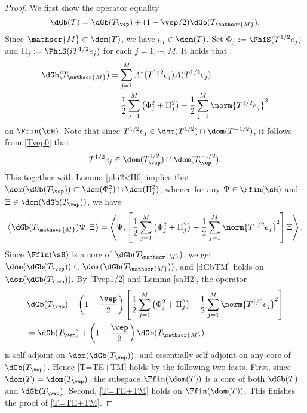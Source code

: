 \documentclass[12pt,draft]{article}
\theoremstyle{plain}
\numberwithin{equation}{section}
\theoremstyle{remark}
\begin{document}
\begin{proof}
We first show the operator equality
\begin{equation}\label{T=TE+TM}
\dGb(T)=\dGb(T_\vep)+(1-\vep/2)\dGb(T_\mathscr{M}).
\end{equation} 
Since $\mathscr{M}\subset\dom(T)$, we have $e_j\in\dom(T)$.
Set $\Phi_j := \PhiS(T^{1/2}e_j)$ and $\Pi_j := \PhiS(iT^{1/2}e_j)$ for each $j=1,\cdots,M$.
It holds that
\begin{align}\label{dGbTM}
 \dGb(T_\mathscr{M}) 
& = \sum_{j=1}^M A^*(T^{1/2}e_j) A(T^{1/2}e_j) \notag\\
& = \frac{1}{2}\sum_{j=1}^M  \left( \Phi_j^2 + \Pi_j^2 \right)
    - \frac{1}{2} \sum_{j=1}^M \norm{T^{1/2}e_j}^2 
\end{align}
on $\Ffin(\sH)$.
Note that since $T^{1/2}e_j\in\dom(T^{1/2})\cap\dom(T^{-1/2})$, 
it follows from \eqref{Tvep0} that 
\begin{equation}\label{Tvep1/2}
T^{1/2}e_j\in\dom(T_\vep^{1/2})\cap\dom(T_\vep^{-1/2}).
\end{equation}
This together with Lemma \ref{phi2<H0} implies that $\dom(\dGb(T_\vep))\subset\dom(\Phi_j^2)\cap\dom(\Pi_j^2)$, 
whence for any $\Psi\in\Ffin(\sH)$ and $\Xi\in\dom(\dGb(T_\vep))$, we have
\begin{equation*}
\left\langle\dGb(T_\mathscr{M})\Psi,\Xi \right\rangle 
= \left\langle\Psi,\left[\frac{1}{2}\sum_{j=1}^M  \left( \Phi_j^2 + \Pi_j^2 \right)
    - \frac{1}{2} \sum_{j=1}^M \norm{T^{1/2}e_j}^2\right]\Xi \right\rangle.
\end{equation*}
Since $\Ffin(\sH)$ is a core of $\dGb(T_\mathscr{M})$, 
we get $\dom(\dGb(T_\vep))\subset\dom(\dGb(T_\mathscr{M}))$, and \eqref{dGbTM} holds on $\dom(\dGb(T_\vep))$.
By \eqref{Tvep1/2} and Lemma \ref{saH2}, the operator
\begin{align*}
&\dGb(T_\vep) + \left(1-\frac{\vep}{2}\right)\left[\frac{1}{2}\sum_{j=1}^M  \left( \Phi_j^2 + \Pi_j^2 \right) - \frac{1}{2} \sum_{j=1}^M \norm{T^{1/2}e_j}^2\right]\\
&= \dGb(T_\vep) + \left(1-\frac{\vep}{2}\right)\dGb(T_\mathscr{M})
\end{align*}
is self-adjoint on $\dom(\dGb(T_\vep))$, and essentially self-adjoint on any core of $\dGb(T_\vep)$.
Hence \eqref{T=TE+TM} holds by the following two facts.
First, since $\dom(T)=\dom(T_\vep)$, the subspace $\Ffin(\dom(T))$ is a core of both $\dGb(T)$ and $\dGb(T_\vep)$.
Second, \eqref{T=TE+TM} holds on $\Ffin(\dom(T))$.
This finishes the proof of \eqref{T=TE+TM}.


\end{proof}
\end{document}
